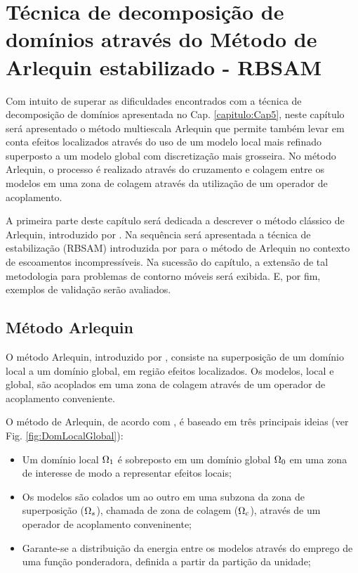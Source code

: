 \documentclass[tese_patricia]{subfiles}
\begin{document}
\chapter[Método de Arlequin estabilizado]{Técnica de decomposição de domínios através do Método de Arlequin estabilizado - RBSAM} \label{capitulo:Cap6}

Com intuito de superar as dificuldades encontrados com a técnica de decomposição de domínios apresentada no Cap. \ref{capitulo:Cap5}, neste capítulo será apresentado o método multiescala Arlequin que permite também levar em conta efeitos localizados através do uso de um modelo local mais refinado superposto a um modelo global com discretização mais grosseira. No método Arlequin, o processo é realizado através do cruzamento e colagem entre os modelos em uma zona de colagem através da utilização de um operador de acoplamento.

A primeira parte deste capítulo será dedicada a descrever o método clássico de Arlequin, introduzido por . Na sequência será apresentada  a técnica de estabilização (RBSAM) introduzida por  para o método de Arlequin no contexto de escoamentos incompressíveis. Na sucessão do capítulo, a extensão de tal metodologia para problemas de contorno móveis será exibida. E, por fim, exemplos de validação serão avaliados.

\section{Método Arlequin}

O método Arlequin, introduzido por , consiste na superposição de um domínio local a um domínio global, em região efeitos localizados. Os modelos, local e global, são acoplados em uma zona de colagem através de um operador de acoplamento conveniente.

O  método de Arlequin, de acordo com , é baseado em três principais ideias (ver Fig. \ref{fig:DomLocalGlobal}):

\begin{itemize}
	\item Um domínio local $\Omega_1$ é sobreposto em um domínio global  $\Omega_0$ em uma zona de interesse de modo a representar efeitos locais;
	\item Os modelos são colados um ao outro em uma subzona da zona de superposição ($\Omega_s$), chamada de zona de colagem ($\Omega_c$), através de um operador de acoplamento conveninente;
	\item  Garante-se a distribuição da energia entre os modelos através do emprego de uma função ponderadora, definida a partir da partição da unidade;
\end{itemize}
\end{document}
